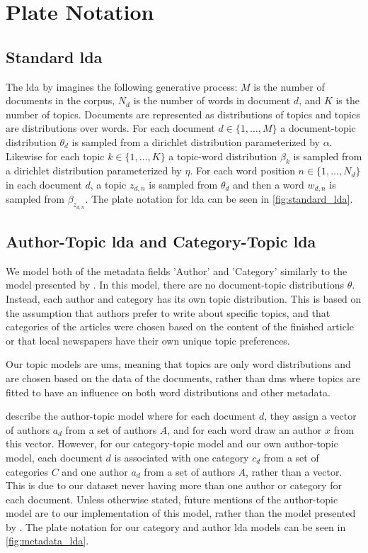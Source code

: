\section{Plate Notation}\label{sec:plate_notation}

\subsection{Standard \gls{lda}}
The \gls{lda} by \citet{blei2003latent} imagines the following generative process:
$M$ is the number of documents in the corpus, $N_d$ is the number of words in document $d$, and $K$ is the number of topics.
Documents are represented as distributions of topics and topics are distributions over words.
For each document $d \in \{1,\dots, M\}$ a document-topic distribution $\theta_d$ is sampled from a dirichlet distribution parameterized by $\alpha$.
Likewise for each topic $k \in \{1,\dots, K\}$ a topic-word distribution $\beta_k$ is sampled from a dirichlet distribution parameterized by $\eta$.
For each word position $n \in \{1, \dots, N_d\}$ in each document $d$, a topic $z_{d,n}$ is sampled from $\theta_d$ and then a word $w_{d,n}$ is sampled from $\beta_{z_{d,n}}$.
The plate notation for \gls{lda} can be seen in \autoref{fig:standard_lda}.



\subsection{Author-Topic \gls{lda} and Category-Topic \gls{lda}}
We model both of the metadata fields 'Author' and 'Category' similarly to the model presented by \citet{author_topic_2012}.
In this model, there are no document-topic distributions $\theta$.
Instead, each author and category has its own topic distribution.
This is based on the assumption that authors prefer to write about specific topics, and that categories of the articles were chosen based on the content of the finished article or that local newspapers have their own unique topic preferences.

Our topic models are \glspl{um}, meaning that topics are only word distributions and are chosen based on the data of the documents, rather than \glspl{dm} where topics are fitted to have an influence on both word distributions and other metadata.

\citet{author_topic_2012} describe the author-topic model where for each document $d$, they assign a vector of authors $a_d$ from a set of authors $A$, and for each word draw an author $x$ from this vector.
However, for our category-topic model and our own author-topic model, each document $d$ is associated with one category $c_d$ from a set of categories $C$ and one author $a_d$ from a set of authors $A$, rather than a vector.
This is due to our dataset never having more than one author or category for each document.
Unless otherwise stated, future mentions of the author-topic model are to our implementation of this model, rather than the model presented by \citet{author_topic_2012}.
The plate notation for our category and author \gls{lda} models can be seen in \autoref{fig:metadata_lda}.

